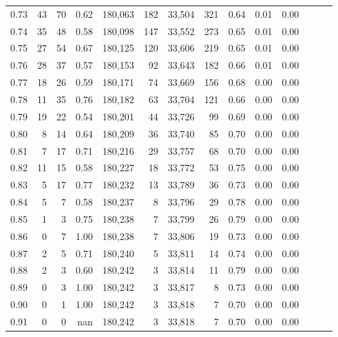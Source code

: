 \begin{tabular}{rrrrrrrrrrrrrr}
0.73 &     43 &     70 &  0.62 &  180,063 &      182 &  33,504 &     321 &  0.64 &  0.01 &      0.00 \\
0.74 &     35 &     48 &  0.58 &  180,098 &      147 &  33,552 &     273 &  0.65 &  0.01 &      0.00 \\
0.75 &     27 &     54 &  0.67 &  180,125 &      120 &  33,606 &     219 &  0.65 &  0.01 &      0.00 \\
0.76 &     28 &     37 &  0.57 &  180,153 &       92 &  33,643 &     182 &  0.66 &  0.01 &      0.00 \\
0.77 &     18 &     26 &  0.59 &  180,171 &       74 &  33,669 &     156 &  0.68 &  0.00 &      0.00 \\
0.78 &     11 &     35 &  0.76 &  180,182 &       63 &  33,704 &     121 &  0.66 &  0.00 &      0.00 \\
0.79 &     19 &     22 &  0.54 &  180,201 &       44 &  33,726 &      99 &  0.69 &  0.00 &      0.00 \\
0.80 &      8 &     14 &  0.64 &  180,209 &       36 &  33,740 &      85 &  0.70 &  0.00 &      0.00 \\
0.81 &      7 &     17 &  0.71 &  180,216 &       29 &  33,757 &      68 &  0.70 &  0.00 &      0.00 \\
0.82 &     11 &     15 &  0.58 &  180,227 &       18 &  33,772 &      53 &  0.75 &  0.00 &      0.00 \\
0.83 &      5 &     17 &  0.77 &  180,232 &       13 &  33,789 &      36 &  0.73 &  0.00 &      0.00 \\
0.84 &      5 &      7 &  0.58 &  180,237 &        8 &  33,796 &      29 &  0.78 &  0.00 &      0.00 \\
0.85 &      1 &      3 &  0.75 &  180,238 &        7 &  33,799 &      26 &  0.79 &  0.00 &      0.00 \\
0.86 &      0 &      7 &  1.00 &  180,238 &        7 &  33,806 &      19 &  0.73 &  0.00 &      0.00 \\
0.87 &      2 &      5 &  0.71 &  180,240 &        5 &  33,811 &      14 &  0.74 &  0.00 &      0.00 \\
0.88 &      2 &      3 &  0.60 &  180,242 &        3 &  33,814 &      11 &  0.79 &  0.00 &      0.00 \\
0.89 &      0 &      3 &  1.00 &  180,242 &        3 &  33,817 &       8 &  0.73 &  0.00 &      0.00 \\
0.90 &      0 &      1 &  1.00 &  180,242 &        3 &  33,818 &       7 &  0.70 &  0.00 &      0.00 \\
0.91 &      0 &      0 &   nan &  180,242 &        3 &  33,818 &       7 &  0.70 &  0.00 &      0.00 \\

\end{tabular}
